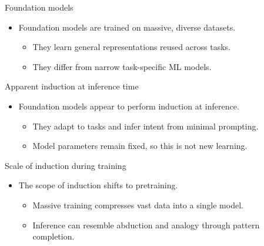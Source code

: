 \documentclass[12pt]{beamer}
\begin{document}
\begin{frame}{Foundation models}
  \begin{itemize}
    \item Foundation models are trained on massive, diverse datasets.
      \begin{itemize}
        \item They learn general representations reused across tasks.
        \item They differ from narrow task-specific ML models.
      \end{itemize}
  \end{itemize}
\end{frame}

\begin{frame}{Apparent induction at inference time}
  \begin{itemize}
    \item Foundation models appear to perform induction at inference.
      \begin{itemize}
        \item They adapt to tasks and infer intent from minimal prompting.
        \item Model parameters remain fixed, so this is not new learning.
      \end{itemize}
  \end{itemize}
\end{frame}

\begin{frame}{Scale of induction during training}
  \begin{itemize}
    \item The scope of induction shifts to pretraining.
      \begin{itemize}
        \item Massive training compresses vast data into a single model.
        \item Inference can resemble abduction and analogy through pattern completion.
      \end{itemize}
  \end{itemize}
\end{frame}

\end{document}
